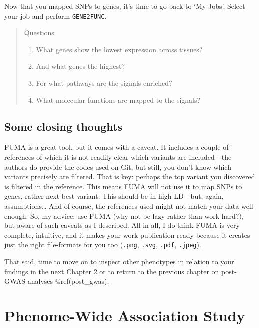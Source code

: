\documentclass[
]{book}
\newcommand{\passthrough}[1]{#1}
\providecommand{\tightlist}{%
  \setlength{\itemsep}{0pt}\setlength{\parskip}{0pt}}
\begin{document}
Now that you mapped SNPs to genes, it's time to go back to `My Jobs'. Select your job and perform \passthrough{\lstinline!GENE2FUNC!}.

\begin{quote}
Questions

\begin{enumerate}
\def\labelenumi{\arabic{enumi}.}
\tightlist
\item
  What genes show the lowest expression across tissues?
\item
  And what genes the highest?
\item
  For what pathways are the signals enriched?
\item
  What molecular functions are mapped to the signals?
\end{enumerate}
\end{quote}

\hypertarget{some-closing-thoughts}{%
\section{Some closing thoughts}\label{some-closing-thoughts}}

FUMA is a great tool, but it comes with a caveat. It includes a couple of references of which it is not readily clear which variants are included - the authors do provide the codes used on Git, but still, you don't know which variants precisely are filtered. That is key: perhaps the top variant you discovered is filtered in the reference. This means FUMA will not use it to map SNPs to genes, rather next best variant. This should be in high-LD - but, again, assumptions\ldots{} And of course, the references used might not match your data well enough.
So, my advice: use FUMA (why not be lazy rather than work hard?), but aware of such caveats as I described. All in all, I do think FUMA is very complete, intuitive, and it makes your work publication-ready because it creates just the right file-formats for you too (\passthrough{\lstinline!.png!}, \passthrough{\lstinline!.svg!}, \passthrough{\lstinline!.pdf!}, \passthrough{\lstinline!.jpeg!}).

That said, time to move on to inspect other phenotypes in relation to your findings in the next Chapter \ref{phewas} or to return to the previous chapter on post-GWAS analyses @ref(post\_gwas).

\hypertarget{phewas}{%
\chapter{Phenome-Wide Association Study}\label{phewas}}
\end{document}
